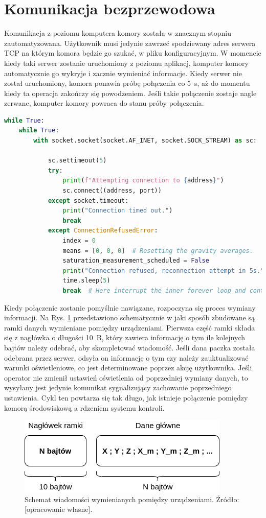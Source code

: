 \section{Komunikacja bezprzewodowa}

Komunikacja z poziomu komputera komory została w znacznym stopniu zautomatyzowana. Użytkownik musi jedynie zawrzeć spodziewany adres serwera TCP na którym komora będzie go szukać, w pliku konfiguracyjnym. W momencie kiedy taki serwer zostanie uruchomiony z poziomu aplikacj, komputer komory automatycznie go wykryje i zacznie wymieniać informacje. Kiedy serwer nie został uruchomiony, komora ponawia próbę połączenia co \SI{5}{s}, aż do momentu kiedy ta operacja zakończy się powodzeniem. Jeśli takie połączenie zostaje nagle zerwane, komputer komory powraca do stanu próby połączenia.
\begin{lstlisting}[language=Python,caption={Obsługa połączenia z serwerem TCP.}]
while True:
	while True:
		with socket.socket(socket.AF_INET, socket.SOCK_STREAM) as sc:
		
			sc.settimeout(5)
			try:
				print(f"Attempting connection to {address}")
				sc.connect((address, port))
			except socket.timeout:
				print("Connection timed out.")
				break
			except ConnectionRefusedError:
				index = 0
				means = [0, 0, 0]  # Resetting the gravity averages.
				saturation_measurement_scheduled = False
				print("Connection refused, reconnection attempt in 5s.")
				time.sleep(5)
				break  # Here interrupt the inner forever loop and continue to watch for the connection.
\end{lstlisting}

Kiedy połączenie zostanie pomyślnie nawiązane, rozpoczyna się proces wymiany informacji. Na Rys. \ref{fig:ramka danych} przedstawiono schematycznie w jaki sposób zbudowane są ramki danych wymieniane pomiędzy urządzeniami. Pierwsza część ramki składa się z nagłówka o długości \SI{10}{B}, który zawiera informację o tym ile kolejnych bajtów należy odebrać, aby skompletować wiadomość. Jeśli dana paczka została odebrana przez serwer, odsyła on informację o tym czy należy zauktualizować warunki oświetleniowe, co jest determinowane poprzez akcję użytkownika. Jeśli operator nie zmienił ustawień oświetlenia od poprzedniej wymiany danych, to wysyłany jest jedynie komunikat sygnalizujący zachowanie poprzedniego ustawienia. Cykl ten powtarza się tak długo, jak istnieje połączenie pomiędzy komorą środowiskową a rdzeniem systemu kontroli.


\begin{figure}[h]
	\centering
	\includegraphics[scale=.5]{ramka}
	\caption{Schemat wiadomości wymienianych pomiędzy urządzeniami. Źródło: [opracowanie własne].} 
	\label{fig:ramka danych}
\end{figure}


